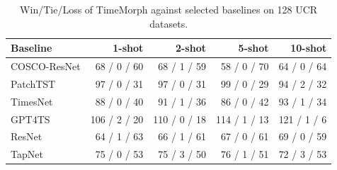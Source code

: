 \begin{table}[t]
\centering
\caption{Win/Tie/Loss of TimeMorph against selected baselines on 128 UCR datasets.}
\label{tab:ucr_fewshot_paper_current-paper-wtl}
\begin{tabular}{lrrrr}
\toprule
Baseline & 1-shot & 2-shot & 5-shot & 10-shot \\
\midrule
COSCO-ResNet & 68 / 0 / 60 & 68 / 1 / 59 & 58 / 0 / 70 & 64 / 0 / 64 \\
PatchTST & 97 / 0 / 31 & 97 / 0 / 31 & 99 / 0 / 29 & 94 / 2 / 32 \\
TimesNet & 88 / 0 / 40 & 91 / 1 / 36 & 86 / 0 / 42 & 93 / 1 / 34 \\
GPT4TS & 106 / 2 / 20 & 110 / 0 / 18 & 114 / 1 / 13 & 121 / 1 / 6 \\
ResNet & 64 / 1 / 63 & 66 / 1 / 61 & 67 / 0 / 61 & 69 / 0 / 59 \\
TapNet & 75 / 0 / 53 & 75 / 3 / 50 & 76 / 1 / 51 & 72 / 3 / 53 \\
\bottomrule
\end{tabular}
\end{table}
